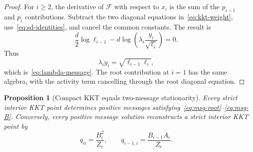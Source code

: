 \documentclass[11pt]{amsart}
\newtheorem{proposition}[theorem]{Proposition}
\theoremstyle{definition}
\newcommand{\Fcal}{\mathcal F}
\begin{document}
\begin{proof}
For $i\ge2$, the derivative of $\Fcal$ with respect to $x_i$ is the sum of the $p_{i-1}$ and $p_i$ contributions.  Subtract the two diagonal equations in~\eqref{eq:kkt-weight}, use~\eqref{eq:sd-identities}, and cancel the common constants.  The result is
\[
 \frac d2\log\ell_{i-1}
 -d\log\left(\lambda_i\frac{y_i}{\sqrt{\ell_i}}\right)=0.
\]
Thus
\[
 \lambda_i y_i=\sqrt{\ell_{i-1}\ell_i},
\]
which is~\eqref{eq:lambda-message}.  The root contribution at $i=1$ has the same algebra, with the activity term cancelling through the root diagonal equation.
\end{proof}

\begin{proposition}[Compact KKT equals two-message stationarity]\label{prop:kkt-message}
Every strict interior KKT point determines positive messages satisfying~\eqref{eq:msg-root}--\eqref{eq:msg-B}.  Conversely, every positive message solution reconstructs a strict interior KKT point by
\[
 q_{ii}=\frac{B_i^2}{Z_e},
 \qquad
 q_{i-1,i}=\frac{B_{i-1}A_i}{Z_e}.
\]
\end{proposition}
\end{document}

